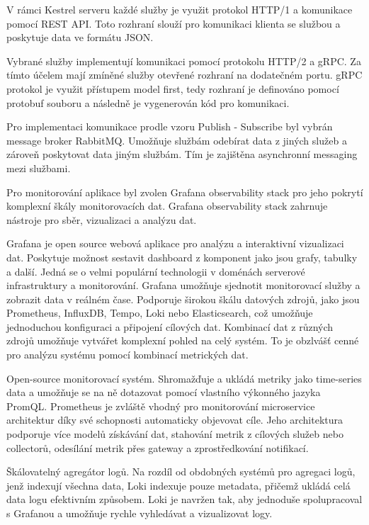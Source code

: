  V rámci Kestrel serveru každé služby je využit protokol HTTP/1 a komunikace pomocí REST API. Toto rozhraní slouží pro komunikaci klienta se službou a poskytuje data ve formátu JSON.

 Vybrané služby implementují komunikaci pomocí protokolu HTTP/2 a gRPC. Za tímto účelem mají zmíněné služby otevřené rozhraní na dodatečném portu. gRPC protokol je využit přístupem model first, tedy rozhraní je definováno pomocí protobuf souboru a následně je vygenerován kód pro komunikaci.

 Pro implementaci komunikace prodle vzoru Publish - Subscribe byl vybrán message broker RabbitMQ. Umožňuje službám odebírat data z jiných služeb a zároveň poskytovat data jiným službám. Tím je zajištěna asynchronní messaging mezi službami.


Pro monitorování aplikace byl zvolen Grafana observability stack pro jeho pokrytí komplexní škály monitorovacích dat. Grafana observability stack zahrnuje nástroje pro sběr, vizualizaci a analýzu dat.


Grafana je open source webová aplikace pro analýzu a interaktivní vizualizaci dat. Poskytuje možnost sestavit dashboard z komponent jako jsou grafy, tabulky a další. Jedná se o velmi populární technologii v doménách serverové infrastruktury a monitorování. Grafana umožňuje sjednotit monitorovací služby a zobrazit data v reálném čase. Podporuje širokou škálu datových zdrojů, jako jsou Prometheus, InfluxDB, Tempo, Loki nebo Elasticsearch, což umožňuje jednoduchou konfiguraci a připojení cílových dat. Kombinací dat z různých zdrojů umožňuje vytvářet komplexní pohled na celý systém. To je obzlvášť cenné pro analýzu systému pomocí kombinací metrických dat.

 
Open-source monitorovací systém. Shromažďuje a ukládá metriky jako time-series data a umožňuje se na ně dotazovat pomocí vlastního výkonného jazyka PromQL. Prometheus je zvláště vhodný pro monitorování microservice architektur díky své schopnosti automaticky objevovat cíle. Jeho architektura podporuje více modelů získávání dat, stahování metrik z cílových služeb nebo collectorů, odesílání metrik přes gateway a zprostředkování notifikací.


Škálovatelný agregátor logů. Na rozdíl od obdobných systémů pro agregaci logů, jenž indexují všechna data, Loki indexuje pouze metadata, přičemž ukládá celá data logu efektivním způsobem. Loki je navržen tak, aby jednoduše spolupracoval s Grafanou a umožňuje rychle vyhledávat a vizualizovat logy.

